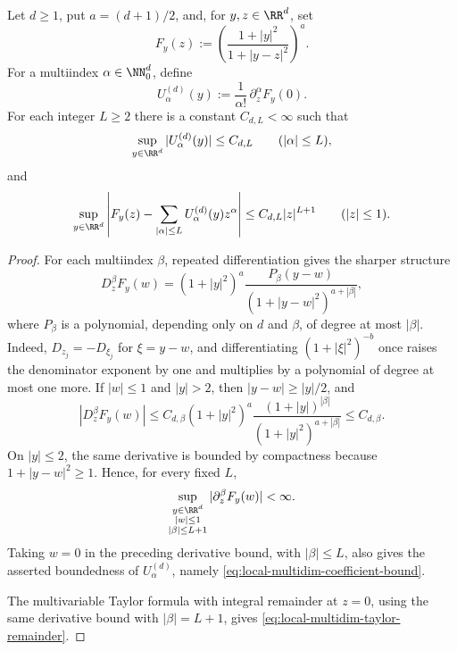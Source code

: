 \begin{lemma}%
\label{lem:local-multidim-quotient-taylor-remainder}
Let \(d\ge1\), put \(a=(d+1)/2\), and, for \(y,z\in\RR^d\), set
\[
F_y(z):=
\left(\frac{1+|y|^2}{1+|y-z|^2}\right)^a .
\]
For a multiindex \(\alpha\in\NN_0^d\), define
\[
U_\alpha^{(d)}(y):=\frac{1}{\alpha!}\,\partial_z^\alpha F_y(0).
\]
For each integer \(L\ge2\) there is a constant \(C_{d,L}<\infty\) such that
\begin{equation}\label{eq:local-multidim-coefficient-bound}
\sup_{y\in\RR^d}|U_\alpha^{(d)}(y)|\le C_{d,L}
\qquad (|\alpha|\le L),
\end{equation}
and
\begin{equation}\label{eq:local-multidim-taylor-remainder}
\sup_{y\in\RR^d}
\left|
F_y(z)-\sum_{|\alpha|\le L}U_\alpha^{(d)}(y)z^\alpha
\right|
\le C_{d,L}|z|^{L+1}
\qquad (|z|\le1).
\end{equation}
\end{lemma}

\begin{proof}
For each multiindex \(\beta\), repeated differentiation gives the sharper
structure
\begin{equation}\label{eq:multidim-poisson-derivative-structure}
D_z^\beta F_y(w)
=(1+|y|^2)^a
\frac{P_\beta(y-w)}{(1+|y-w|^2)^{a+|\beta|}},
\end{equation}
where \(P_\beta\) is a polynomial, depending only on \(d\) and \(\beta\),
of degree at most \(|\beta|\).  Indeed, \(D_{z_j}=-D_{\xi_j}\) for
\(\xi=y-w\), and differentiating \((1+|\xi|^2)^{-b}\) once raises the
denominator exponent by one and multiplies by a polynomial of degree at most
one more.  If \(|w|\le1\) and \(|y|>2\), then \(|y-w|\ge |y|/2\), and
\[
|D_z^\beta F_y(w)|
\le
C_{d,\beta}
(1+|y|^2)^a
\frac{(1+|y|)^{|\beta|}}{(1+|y|^2)^{a+|\beta|}}
\le C_{d,\beta}.
\]
On \(|y|\le2\), the same derivative is bounded by compactness because
\(1+|y-w|^2\ge1\).  Hence, for every fixed \(L\),
\[
\sup_{\substack{y\in\RR^d\\ |w|\le1\\ |\beta|\le L+1}}
|\partial_z^\beta F_y(w)|<\infty .
\]
Taking \(w=0\) in the preceding derivative bound, with
\(|\beta|\le L\), also gives the asserted boundedness of
\(U_\alpha^{(d)}\), namely \eqref{eq:local-multidim-coefficient-bound}.

The multivariable Taylor formula with integral remainder at \(z=0\), using
the same derivative bound with \(|\beta|=L+1\), gives
\eqref{eq:local-multidim-taylor-remainder}.
\end{proof}

